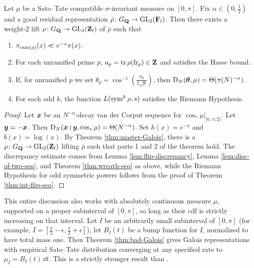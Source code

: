 \begin{theorem}\label{thm:bad-Galois}
Let $\mu$ be a Sato--Tate compatible $\sigma$-invariant measure on $[0,\pi]$. 
Fix $\alpha\in \left(0,\frac 1 2\right)$ and a good residual representation 
$\bar\rho\colon G_{\mathbf{Q}} \to \operatorname{GL}_2(\mathbf{F}_l)$. Then there exists a weight-$2$ lift 
$\rho\colon G_{\mathbf{Q}} \to \operatorname{GL}_2(\mathbf{Z}_l)$ of $\bar\rho$ such that 
\begin{enumerate}
\item
$\pi_{\mathrm{ram}(\rho)}(x) \ll e^{-x}\pi(x)$. 

\item
For each unramified prime $p$, $a_p = \operatorname{tr}\rho(\mathrm{fr}_p)\in \mathbf{Z}$ and satisfies 
the Hasse bound. 

\item
If, for unramified $p$ we set 
$\theta_p = \cos^{-1}\left(\frac{a_p}{2\sqrt p}\right)$, then 
$\operatorname{D}_N({\boldsymbol\theta},\mu) = \Theta(\pi(N)^{-\alpha})$. 

\item
For each odd $k$, the function $L(\operatorname{sym}^k \rho,s)$ satisfies the Riemann 
Hypothesis. 
\end{enumerate}
\end{theorem}
\begin{proof}
Let ${\boldsymbol x}$ be an $N^{-\alpha}$-decay van der Corput sequence for 
$\cos_\ast \left.\mu\right|_{[0,\pi/2)}$. Let ${\boldsymbol y} = -{\boldsymbol x}$. Then 
$\operatorname{D}_N({\boldsymbol x}\wr{\boldsymbol y},\cos_\ast\mu) = \Theta(N^{-\alpha})$. Set $h(x) = e^{-x}$ 
and $b(x) = \log(x)$. By Theorem \ref{thm:master-Galois}, there is a 
$\rho\colon G_{\mathbf{Q}} \to \operatorname{GL}_2(\mathbf{Z}_l)$ lifting $\bar\rho$ such that parts 
1 and 2 of the theorem hold. The discrepancy estimate comes from Lemma 
\ref{lem:flip-discrepancy}, Lemma \ref{lem:disc-of-two-seq}, and Theorem 
\ref{thm:wreath-seq} as above, while the Riemann Hypothesis for odd symmetric 
powers follows from the proof of Theorem \ref{thm:int-flip-seq}. 
\end{proof}

This entire discussion also works with absolutely continuous measure $\mu$, 
supported on a proper subinterval of $[0,\pi]$, so long as their cdf is 
strictly increasing on that interval. Let $I$ be an arbitrarily small 
subinterval of $[0,\pi]$ (for example, 
$I = \left[\frac \pi 2 - \epsilon,\frac \pi 2 + \epsilon\right]$), let $B_I(t)$ 
be a bump function for $I$, normalized to have total mass one. Then Theorem 
\ref{thm:bad-Galois} gives Galois representations with empirical Sato--Tate 
distribution converging at any specified rate to $\mu_I = B_I(t)\, \dd t$. This 
is a strictly stronger result than \cite[Th.~5.2]{pande-2011}. 
